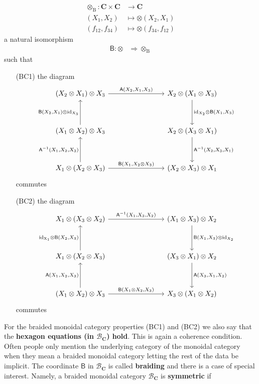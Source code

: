 \begin{align*}
  \otimes_{\textrm{B}}
  \colon
  \mathbf{C}
  \times
  \mathbf{C}
  &\rightarrow
  \mathbf{C}
  \\
  (X_{1},X_{2})
  &\mapsto
  \otimes(X_{2},X_{1})
  \\
  (f_{12},f_{34})
  &\mapsto
  \otimes(f_{34},f_{12})
\end{align*}
a natural isomorphism
\begin{align*}
  \mathsf{B}
  \colon
  \otimes
  &\Rightarrow
  \otimes_{\textrm{B}}
\end{align*}
such that
\begin{enumerate}
\item[(BC1)]
the diagram
\[
\begin{tikzcd}[row sep=huge,column sep=8em]
  (X_{2} \otimes X_{1})
  \otimes
  X_{3}
  \arrow{r}{\mathsf{A}(X_{2},X_{1},X_{3})}
  &
  X_{2}
  \otimes
  (X_{1} \otimes X_{3})
  \arrow{d}{\mathrm{id}_{X_{2}} \otimes \mathsf{B}(X_{1},X_{3})}
  \\
  (X_{1} \otimes X_{2})
  \otimes
  X_{3}
  \arrow{u}{\mathsf{B}(X_{2},X_{1}) \otimes \mathrm{id}_{X_{3}}}
  &
  X_{2}
  \otimes
  (X_{3} \otimes X_{1})
  \arrow{d}{\mathsf{A}^{-1}(X_{2},X_{3},X_{1})}
  \\
  X_{1}
  \otimes
  (X_{2} \otimes X_{3})
  \arrow{u}{\mathsf{A}^{-1}(X_{1},X_{2},X_{3})}
  \arrow{r}{\mathsf{B}(X_{1},X_{2} \otimes X_{3})}
  &
  (X_{2} \otimes X_{3})
  \otimes
  X_{1}
\end{tikzcd}
\]
commutes
\item[(BC2)]
the diagram
\[
\begin{tikzcd}[row sep=huge,column sep=8em]
  X_{1}
  \otimes
  (X_{3} \otimes X_{2})
  \arrow{r}{\mathsf{A}^{-1}(X_{1},X_{3},X_{2})}
  &
  (X_{1} \otimes X_{3})
  \otimes
  X_{2}
  \arrow{d}{\mathsf{B}(X_{1},X_{3}) \otimes \mathrm{id}_{X_{2}}}
  \\
  X_{1}
  \otimes
  (X_{2} \otimes X_{3})
  \arrow{u}{\mathrm{id_{X_{1}}} \otimes \mathsf{B}(X_{2},X_{3})}
  &
  (X_{3} \otimes X_{1})
  \otimes
  X_{2}
  \arrow{d}{\mathsf{A}(X_{3},X_{1},X_{2})}
  \\
  (X_{1} \otimes X_{2})
  \otimes
  X_{3}
  \arrow{u}{\mathsf{A}(X_{1},X_{2},X_{3})}
  \arrow{r}{\mathsf{B}(X_{1} \otimes X_{2},X_{3})}
  &
  X_{3}
  \otimes
  (X_{1} \otimes X_{2})
\end{tikzcd}
\]
commutes
\end{enumerate}
For the braided monoidal category properties (BC1) and (BC2) we also say that the \textbf{hexagon equations (in $\mathcal{B}_{\mathbf{C}}$) hold}. This is again a coherence condition. Often people only mention the underlying category of the monoidal category when they mean a braided monoidal category letting the rest of the data be implicit. The coordinate $\mathsf{B}$ in $\mathcal{B}_{\mathbf{C}}$ is called \textbf{braiding} and there is a case of special interest. Namely, a braided monoidal category $\mathcal{B}_{\mathbf{C}}$ is \textbf{symmetric} if
